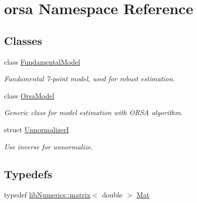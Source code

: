 \hypertarget{namespaceorsa}{}\section{orsa Namespace Reference}
\label{namespaceorsa}
\subsection*{Classes}
\begin{DoxyCompactItemize}
\item 
class \hyperlink{classorsa_1_1FundamentalModel}{Fundamental\+Model}
\begin{DoxyCompactList}\small\item\em Fundamental 7-\/point model, used for robust estimation. \end{DoxyCompactList}\item 
class \hyperlink{classorsa_1_1OrsaModel}{Orsa\+Model}
\begin{DoxyCompactList}\small\item\em Generic class for model estimation with O\+R\+S\+A algorithm. \end{DoxyCompactList}\item 
struct \hyperlink{structorsa_1_1UnnormalizerI}{Unnormalizer\+I}
\begin{DoxyCompactList}\small\item\em Use inverse for unnormalize. \end{DoxyCompactList}\end{DoxyCompactItemize}
\subsection*{Typedefs}
\begin{DoxyCompactItemize}
\item 
typedef \hyperlink{classlibNumerics_1_1matrix}{lib\+Numerics\+::matrix}$<$ double $>$ \hyperlink{namespaceorsa_a313ec0d31d0828c8410a7f348a5e5263}{Mat}
\end{DoxyCompactItemize}
